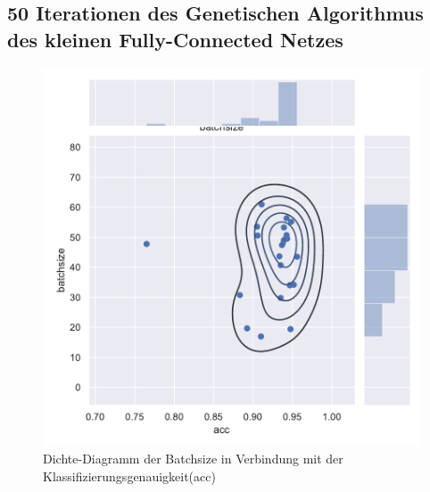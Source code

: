 \subsection{50 Iterationen des Genetischen Algorithmus des kleinen Fully-Connected Netzes}
\begin{figure}[H]
  \centering  
  \includegraphics[scale=0.5]{anhang/GA_50_mnist_digits_True_small_jointplot_batchsize.pdf}
  \caption{Dichte-Diagramm der Batchsize in Verbindung mit der Klassifizierungsgenauigkeit(acc)}
  
\end{figure}

